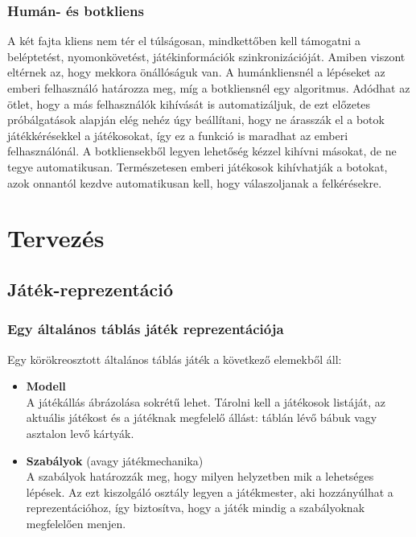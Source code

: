 \documentclass[twoside, a4paper, 12pt]{article}
\begin{document}
\subsubsection{Humán- és botkliens}
A két fajta kliens nem tér el túlságosan, mindkettőben kell támogatni a beléptetést, nyomonkövetést, játékinformációk szinkronizációját. Amiben viszont eltérnek az, hogy mekkora önállóságuk van. A humánkliensnél a lépéseket az emberi felhasználó határozza meg, míg a botkliensnél egy algoritmus. Adódhat az ötlet, hogy a más felhasználók kihívását is automatizáljuk, de ezt előzetes próbálgatások alapján elég nehéz úgy beállítani, hogy ne árasszák el a botok játékkérésekkel a játékosokat, így ez a funkció is maradhat az emberi felhasználónál. A botkliensekből legyen lehetőség kézzel kihívni másokat, de ne tegye automatikusan. Természetesen emberi játékosok kihívhatják a botokat, azok onnantól kezdve automatikusan kell, hogy válaszoljanak a felkérésekre.


\newpage
\section{Tervezés}
\subsection{Játék-reprezentáció}

\subsubsection{Egy általános táblás játék reprezentációja}

Egy körökreosztott általános táblás játék a következő elemekből áll:

\begin{itemize}
	\item \textbf{Modell} \\
	A játékállás ábrázolása sokrétű lehet. Tárolni kell a játékosok listáját, az aktuális játékost és a játéknak megfelelő állást: táblán lévő bábuk vagy asztalon levő kártyák.
	
	\item \textbf{Szabályok} (avagy játékmechanika) \\
	A szabályok határozzák meg, hogy milyen helyzetben mik a lehetséges lépések. Az ezt kiszolgáló osztály legyen a játékmester, aki hozzányúlhat a reprezentációhoz, így biztosítva, hogy a játék mindig a szabályoknak megfelelően menjen.
\end{itemize}
\end{document}
